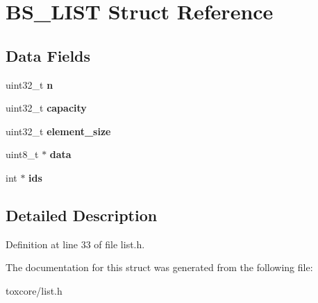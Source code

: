 \hypertarget{struct_b_s___l_i_s_t}{\section{B\+S\+\_\+\+L\+I\+S\+T Struct Reference}
\label{struct_b_s___l_i_s_t}
}
\subsection*{Data Fields}
\begin{DoxyCompactItemize}
\item 
\hypertarget{struct_b_s___l_i_s_t_a3d8a9527a2ee4a7ebf59175650142e75}{uint32\+\_\+t {\bfseries n}}\label{struct_b_s___l_i_s_t_a3d8a9527a2ee4a7ebf59175650142e75}

\item 
\hypertarget{struct_b_s___l_i_s_t_a391c992c66c3e5540265a85ec2b9216a}{uint32\+\_\+t {\bfseries capacity}}\label{struct_b_s___l_i_s_t_a391c992c66c3e5540265a85ec2b9216a}

\item 
\hypertarget{struct_b_s___l_i_s_t_a4ff545e181548785b8e257d2a8ac857a}{uint32\+\_\+t {\bfseries element\+\_\+size}}\label{struct_b_s___l_i_s_t_a4ff545e181548785b8e257d2a8ac857a}

\item 
\hypertarget{struct_b_s___l_i_s_t_abe222f6d3581e7920dcad5306cc906a8}{uint8\+\_\+t $\ast$ {\bfseries data}}\label{struct_b_s___l_i_s_t_abe222f6d3581e7920dcad5306cc906a8}

\item 
\hypertarget{struct_b_s___l_i_s_t_a6081d5fc46a8899b4beb60b0df7dd190}{int $\ast$ {\bfseries ids}}\label{struct_b_s___l_i_s_t_a6081d5fc46a8899b4beb60b0df7dd190}

\end{DoxyCompactItemize}


\subsection{Detailed Description}


Definition at line 33 of file list.\+h.



The documentation for this struct was generated from the following file\+:\begin{DoxyCompactItemize}
\item 
toxcore/list.\+h\end{DoxyCompactItemize}
